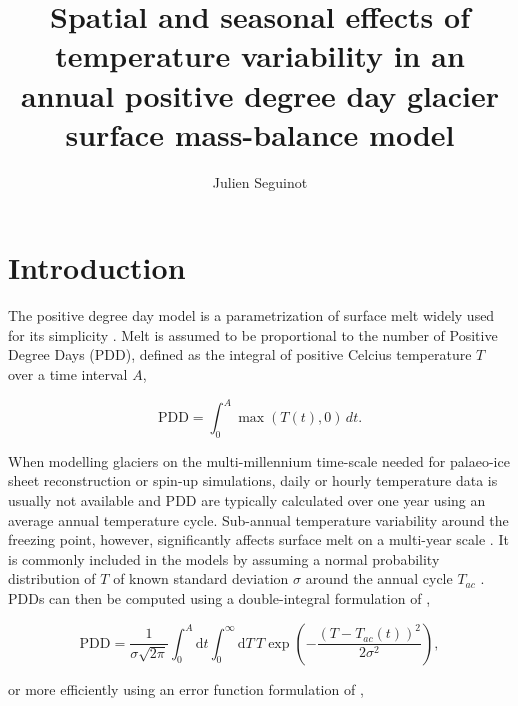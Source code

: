 \documentclass[review]{igs}
\begin{document}
\title[Temperature variability in a positive degree day model]{Spatial and seasonal effects of temperature variability in an annual positive degree day glacier surface mass-balance model}
\author[J. Seguinot]{Julien Seguinot}

\maketitle


\section{Introduction}

The positive degree day model is a parametrization of surface melt widely used for its simplicity \citep{hock-2003}. Melt is assumed to be proportional to the number of Positive Degree Days (PDD), defined as the integral of positive Celcius temperature $T$ over a time interval $A$,

\begin{equation} \label{eq:pdd}
  \mathrm{PDD} = \int_{0}^{A}\max(T(t),0)\,dt.
\end{equation}

When modelling glaciers on the multi-millennium time-scale needed for palaeo-ice sheet reconstruction or spin-up simulations, daily or hourly temperature data is usually not available and PDD are typically calculated over one year using an average annual temperature cycle. Sub-annual temperature variability around the freezing point, however, significantly affects surface melt on a multi-year scale \citep{arnold-mackay-1964}. It is commonly included in the models by assuming a normal probability distribution of $T$ of known standard deviation $\sigma$ around the annual cycle $T_{ac}$ \citep{braithwaite-1984}. PDDs can then be computed using a double-integral formulation of \citet{reeh-1991},

\begin{equation} \label{eq:reeh}
  \mathrm{PDD} = \frac{1}{\sigma\sqrt{2\pi}}
    \int_{0}^{A} \mathrm{d}t
    \int_{0}^{\infty} \mathrm{d}T \,
    T \exp\left({-\frac{(T-T_{ac}(t))^2}{2\sigma^2}}\right),
\end{equation}

or more efficiently using an error function formulation of \citet{calov-greve-2005},
\end{document}
